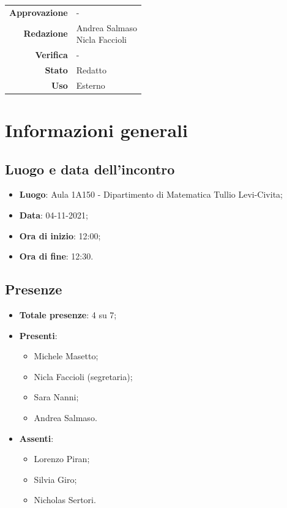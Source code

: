 \documentclass[11pt]{article}
\begin{document}
\begin{titlepage}
\begin{center}
			\large
			
			
			\vfill
			
			\begin{tabular}{r|l}
				\textbf{Approvazione} &  -\\
				\textbf{Redazione} &  \parbox[t]{3.5cm}{Andrea Salmaso \\Nicla Faccioli}\\
				\textbf{Verifica} &  -\\
				\textbf{Stato} & Redatto \\
				\textbf{Uso} & Esterno
			\end{tabular}
			\vfill
			
		\end{center}
	\end{titlepage}

	\newpage

	\section{Informazioni generali}
	\subsection{Luogo e data dell'incontro}
	\begin{itemize}
		\item \textbf{Luogo}: Aula 1A150 - Dipartimento di Matematica Tullio Levi-Civita;
		\item \textbf{Data}: 04-11-2021;
		\item \textbf{Ora di inizio}: 12:00;
		\item \textbf{Ora di fine}: 12:30.
	\end{itemize}
	
	\subsection{Presenze}
	\begin{itemize}
		\item \textbf{Totale presenze}: 4 su 7;
		\item \textbf{Presenti}:
		\begin{itemize}  
			\item Michele Masetto;
			\item Nicla Faccioli (segretaria);
			\item Sara Nanni;
			\item Andrea Salmaso.
		\end{itemize}
		\item \textbf{Assenti}:
			\begin{itemize}
				\item Lorenzo Piran;
				\item Silvia Giro;
				\item Nicholas Sertori.
			\end{itemize}
	\end{itemize}
\end{document}
